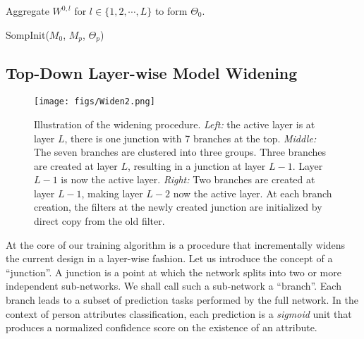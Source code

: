 \documentclass[10pt,twocolumn,letterpaper]{article}
\begin{document}
\begin{algorithm}[!t]\label{alg:init} \small
	
	Aggregate $W^{0,l}$ for $l \in \{1, 2, \cdots, L\}$ to form $\Theta_0$. 
	\caption{SompInit($M_0$, $M_p$, $\Theta_p$)}
\end{algorithm}

\subsection{Top-Down Layer-wise Model Widening}
\label{sec:widen}

\begin{figure*}[t]
	\begin{center}
		\texttt{[image: figs/Widen2.png]}  
	\end{center}
	\caption{Illustration of the widening procedure. {\em Left:} the active layer is at layer $L$, there is one junction with 7 branches at the top. {\em Middle:} The seven branches are clustered into three groups. Three branches are created at layer $L$, resulting in a junction at layer $L-1$. Layer $L-1$ is now the active layer. {\em Right:}  Two branches are created at layer $L-1$, making layer $L-2$ now the active layer. At each branch creation, the filters at the newly created junction are initialized by direct copy from the old filter. }
	\label{fig:widen}
\end{figure*}

At the core of our training algorithm is a procedure that incrementally widens the current design in a layer-wise fashion. %
Let us 
introduce the concept of a ``junction''. A junction is a point at which the network splits into two or more independent sub-networks. We shall call such a sub-network a ``branch''. Each branch leads to a subset of prediction tasks performed by the full network. In the context of person attributes classification, each prediction is a {\em sigmoid} unit that produces a normalized confidence score on the existence of an attribute.
\end{document}
